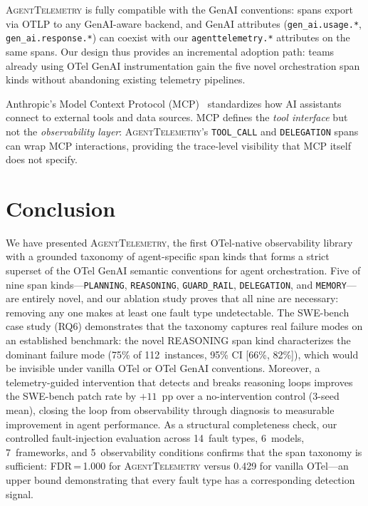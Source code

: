 \documentclass[sigplan,10pt,screen]{acmart}
\begin{document}
\textsc{AgentTelemetry} is fully compatible with the GenAI conventions:
spans export via OTLP to any GenAI-aware backend, and GenAI attributes
(\texttt{gen\_ai.usage.*}, \texttt{gen\_ai.response.*}) can coexist with
our \texttt{agenttelemetry.*} attributes on the same spans.  Our design
thus provides an incremental adoption path: teams already using OTel
GenAI instrumentation gain the five novel orchestration span kinds
without abandoning existing telemetry pipelines.

Anthropic's Model Context Protocol (MCP)~\cite{mcp} standardizes how
AI assistants connect to external tools and data sources.  MCP defines
the \emph{tool interface} but not the \emph{observability layer}:
\textsc{AgentTelemetry}'s \texttt{TOOL\_CALL} and \texttt{DELEGATION}
spans can wrap MCP interactions, providing the trace-level visibility
that MCP itself does not specify.

\section{Conclusion}
\label{sec:conclusion}

We have presented \textsc{AgentTelemetry}, the first OTel-native
observability library with a grounded taxonomy of agent-specific span
kinds that forms a strict superset of the OTel GenAI semantic
conventions for agent orchestration.  Five of nine span
kinds---\texttt{PLANNING}, \texttt{REASONING}, \texttt{GUARD\_RAIL},
\texttt{DELEGATION}, and \texttt{MEMORY}---are entirely novel, and
our ablation study proves that all nine are
necessary: removing any one makes at least one fault type undetectable.
The SWE-bench case study (RQ6) demonstrates that the taxonomy captures real failure modes on an established benchmark: the novel REASONING span kind characterizes the dominant failure mode (75\% of 112~instances, 95\% CI [66\%, 82\%]), which would be invisible under vanilla OTel or OTel GenAI conventions.  Moreover, a telemetry-guided intervention that detects and breaks reasoning loops improves the SWE-bench patch rate by $+11$~pp over a no-intervention control (3-seed mean), closing the loop from observability through diagnosis to measurable improvement in agent performance.
As a structural completeness check, our controlled fault-injection
evaluation across 14~fault types, 6~models, 7~frameworks, and
5~observability conditions confirms that the span taxonomy is
sufficient: FDR\,=\,1.000 for \textsc{AgentTelemetry} versus 0.429 for
vanilla OTel---an upper bound demonstrating that every fault type has a
corresponding detection signal.
\end{document}
